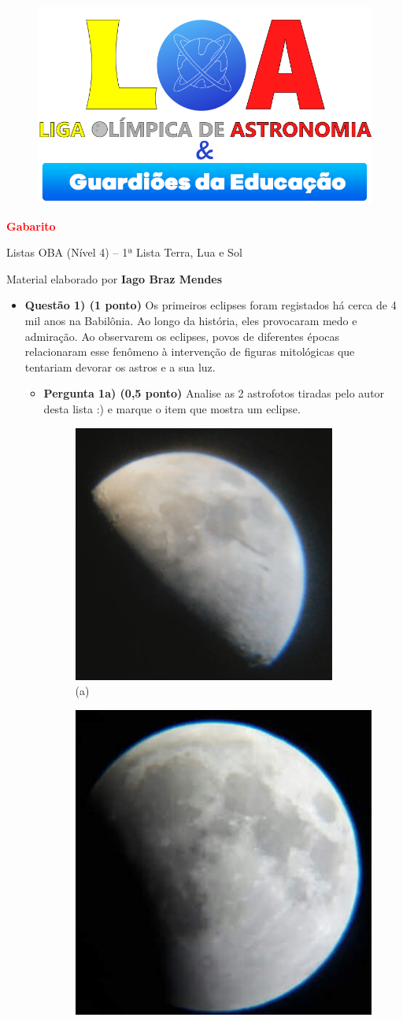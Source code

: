 \documentclass[a4paper, 12pt]{article}
\newcommand{\cabecalho}[4]
{
	\begin{figure}
		\centering
		\href{https://ligaolimpicadeastronomia.com.br/}{\includegraphics[scale=0.6]{./img/logos.png}}
	\end{figure}
	
	\begin{center}
		\begin{large}
			\textbf{#1}	
		\end{large}
			\linebreak Listas OBA (Nível 4) -- #2ª Lista
			\linebreak #3
		\end{center}
	
	\begin{flushright}
		Material elaborado por \textbf{#4}
	\end{flushright}
}
\begin{document}
	\cabecalho{\textcolor{red}{Gabarito}}{1}{Terra, Lua e Sol}{Iago Braz Mendes}
	
	\begin{flushleft}
	\begin{itemize}
		\item \textbf{Questão 1) (1 ponto)} Os primeiros eclipses foram registados há cerca de 4 mil anos na Babilônia. Ao longo da história, eles provocaram medo e admiração. Ao observarem os eclipses, povos de diferentes épocas relacionaram esse fenômeno à intervenção de figuras mitológicas que tentariam devorar os astros e a sua luz.
			\begin{itemize}
				\item \textbf{Pergunta 1a) (0,5 ponto)} Analise as 2 astrofotos tiradas pelo autor desta lista :) e marque o item que mostra um eclipse.
					\begin{multicols}{2}
						\begin{figure}[H]
							\centering
							\includegraphics[width=.6\linewidth]{./img/1-cre.png}
							\captionsetup{labelformat=empty}
							\caption{(a)}
							\end{figure}
						\begin{figure}[H]
							\centering
							\includegraphics[width=.6\linewidth]{./img/1-ecl.jpg}

\end{figure}
\end{multicols}
\end{itemize}
\end{itemize}
\end{flushleft}
\end{document}
